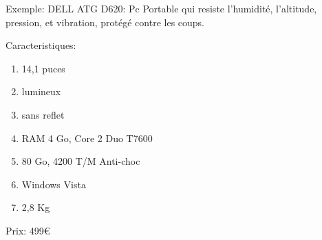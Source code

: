 \documentclass [a4paper] {report}
\begin{document}
Exemple:
DELL ATG D620: Pc Portable qui resiste l'humidité, l'altitude, pression, et vibration, protégé 
contre les coups.
	
	Caracteristiques:

	\begin{enumerate}
		\item 14,1 puces
		\item lumineux
		\item sans reflet
		\item RAM 4 Go, Core 2 Duo T7600
		\item 80 Go, 4200 T/M Anti-choc
		\item Windows Vista
		\item 2,8 Kg
	\end{enumerate}

Prix: 499€
\end{document}
